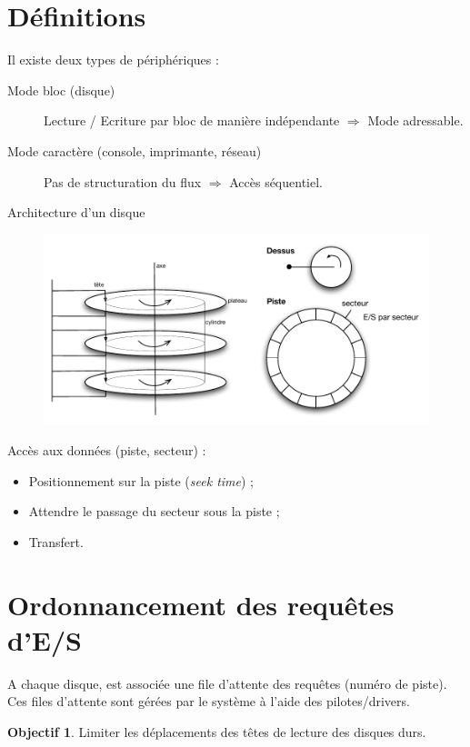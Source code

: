 \documentclass[11pt,english,french]{scrreprt}
\theoremstyle{remark}
\theoremstyle{definition}
\newtheorem*{obj*}{Objectif}
\begin{document}
\section{Définitions}

Il existe deux types de périphériques : 
\begin{description}
	\item [Mode bloc (disque)] Lecture / Ecriture par bloc de manière indépendante $\Rightarrow$ Mode adressable.
	\item [Mode caractère (console, imprimante, réseau)] Pas de structuration du flux $\Rightarrow$ Accès séquentiel.
\end{description}

Architecture d'un disque 
\begin{figure}[h!]
	\center
	\vspace{-10pt}
	\includegraphics[scale=.85]{img/HD}
\end{figure}

Accès aux données (piste, secteur) :
\begin{itemize}
	\item Positionnement sur la piste (\emph{seek time}) ;
	\item Attendre le passage du secteur sous la piste ;
	\item Transfert.
\end{itemize}

\section{Ordonnancement des requêtes d'E/S}
A chaque disque, est associée une file d'attente des requêtes (numéro de piste). Ces files d'attente sont gérées par le système à l'aide des pilotes/drivers.

\begin{obj*}
	Limiter les déplacements des têtes de lecture des disques durs.
\end{obj*}
\end{document}

